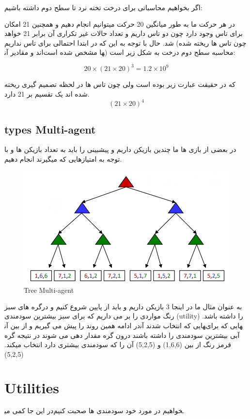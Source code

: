 اگر بخواهیم محاسباتی برای درخت تخته نرد تا سطح دوم داشته باشیم:

در هر حرکت ما به طور میانگین 20 حرکت میتوانیم انجام دهیم و همچنین 21 امکان برای تاس وجود دارد چون دو تاس داریم و تعداد حالات غیر تکراری آن برابر 21 خواهد شد. حال با توجه به این که در ابتدا احتمالی برای تاس نداریم (چون تاس ها ریخته شده اند و مقادیر آن‎ها مشخص شده است) محاسبه سطح دوم درخت به شکل زیر است:

\begin{equation}
20 \times (21 \times 20)^3 = 1.2 \times 10^9
\end{equation}

که در حقیقت عبارت زیر بوده است ولی چون تاس ها در لحظه تصمیم گیری ریخته شده اند یک تقسیم بر 21 دارد.
\begin{equation}
(21 \times 20)^4
\end{equation}


\subsection{types Multi-agent}
در بعضی از بازی ها ما چندین بازیکن داریم و پیشبینی را باید به تعداد بازیکن ها و با توجه به امتیازهایی که میگیرند انجام دهیم.

\begin{figure}[h!]
    \centering
    \includegraphics[width=0.8\linewidth]{images/multiagentTree.jpg}
    \caption{Tree Multi-agent}
\end{figure}

به عنوان مثال ما در اینجا 3 بازیکن داریم و باید از پایین شروع کنیم و درگره های سبز رنگ مواردی را بر می داریم که برای سبز بیشترین سودمندی (utility) را داشته باشد. در ادامه همین روند را پیش می گیریم و از بین آن‎هایی که انتخاب شدند آن‎هایی که برای آبی بیشترین سودمندی را داشته باشند درون گره مقدار دهی می شوند در نتیجه گره قرمز رنگ از بین (1,6,6) و (5,2,5) آن را که سودمندی بیشتری دارد انتخاب میکند. (5,2,5)

\section{Utilities}
در این جا کمی می‎خواهیم در مورد خود سودمندی ها صحبت کنیم.

